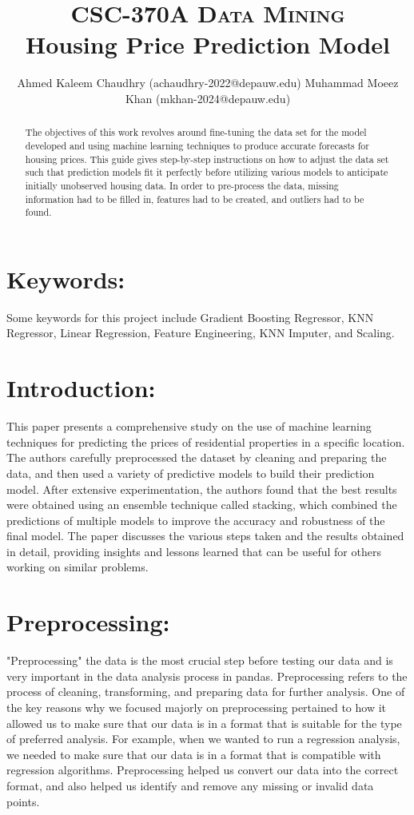 \documentclass[10pt,twocolumn,letterpaper]{article}
\title{
		\usefont{OT1}{bch}{b}{n}
		\normalfont \normalsize \textsc{CSC-370A Data Mining} \\ [14pt]
		\huge Housing Price Prediction Model \\
}
\author[1]{Ahmed Kaleem Chaudhry (achaudhry-2022@depauw.edu) Muhammad Moeez Khan (mkhan-2024@depauw.edu)}
\begin{document}
\maketitle


\begin{abstract}
The objectives of this work revolves around fine-tuning the data set for the model developed and using machine learning techniques to produce accurate forecasts for housing prices. This guide gives step-by-step instructions on how to adjust the data set such that prediction models fit it perfectly before utilizing various models to anticipate initially unobserved housing data. In order to pre-process the data, missing information had to be filled in, features had to be created, and outliers had to be found.\end{abstract}


\section{Keywords:}
Some keywords for this project include  Gradient Boosting Regressor, KNN Regressor, Linear Regression, Feature Engineering, KNN Imputer, and Scaling.

\section{Introduction:}
This paper presents a comprehensive study on the use of machine learning techniques for predicting the prices of residential properties in a specific location. The authors carefully preprocessed the dataset by cleaning and preparing the data, and then used a variety of predictive models to build their prediction model. After extensive experimentation, the authors found that the best results were obtained using an ensemble technique called stacking, which combined the predictions of multiple models to improve the accuracy and robustness of the final model. The paper discusses the various steps taken and the results obtained in detail, providing insights and lessons learned that can be useful for others working on similar problems.

\section{Preprocessing:}
"Preprocessing" the data is the most crucial step before testing our data and is very important in the data analysis process in pandas. Preprocessing refers to the process of cleaning, transforming, and preparing data for further analysis. One of the key reasons why we focused majorly on preprocessing pertained to how it allowed us to make sure that our data is in a format that is suitable for the type of preferred analysis. For example, when we wanted to run a regression analysis, we needed to make sure that our data is in a format that is compatible with regression algorithms. Preprocessing helped us convert our data into the correct format, and also helped us identify and remove any missing or invalid data points.
\end{document}
